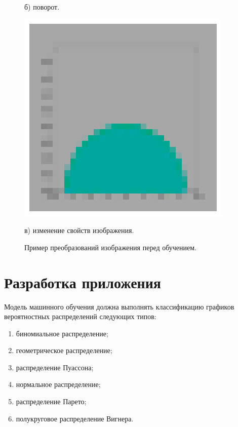\documentclass[14pt, russian]{scrartcl}
\begin{document}
\begin{figure}[H]
\begin{minipage}[t]{.3\textwidth}
		\caption*{б) поворот.}
	\end{minipage}
	\begin{minipage}[t]{.3\textwidth}
		\centering
		\includegraphics[width=\linewidth]{./img/color.png}
		\caption*{в) изменение свойств изображения.}
	\end{minipage}
	\caption{Пример преобразований изображения перед обучением.}
	\label{fig:transforms}
\end{figure}

\section{Разработка приложения}
Модель машинного обучения должна выполнять классификацию графиков вероятностных распределений следующих типов:
\begin{enumerate} 
    \item биномиальное распределение;
    \item геометрическое распределение;
    \item распределение Пуассона;
    \item нормальное распределение;
    \item распределение Парето;
    \item полукруговое распределение Вигнера.
\end{enumerate}
\end{document}
